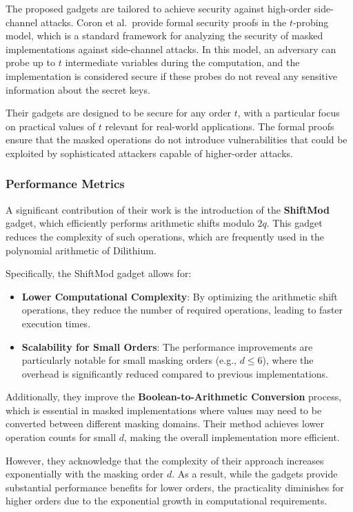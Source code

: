 The proposed gadgets are tailored to achieve security against high-order side-channel attacks. Coron et al.\ provide formal security proofs in the $t$-probing model, which is a standard framework for analyzing the security of masked implementations against side-channel attacks. In this model, an adversary can probe up to $t$ intermediate variables during the computation, and the implementation is considered secure if these probes do not reveal any sensitive information about the secret keys.

Their gadgets are designed to be secure for any order $t$, with a particular focus on practical values of $t$ relevant for real-world applications. The formal proofs ensure that the masked operations do not introduce vulnerabilities that could be exploited by sophisticated attackers capable of higher-order attacks.

\subsubsection{Performance Metrics}

A significant contribution of their work is the introduction of the \textbf{ShiftMod} gadget, which efficiently performs arithmetic shifts modulo $2q$. This gadget reduces the complexity of such operations, which are frequently used in the polynomial arithmetic of Dilithium.

Specifically, the ShiftMod gadget allows for:

\begin{itemize}
    \item \textbf{Lower Computational Complexity}: By optimizing the arithmetic shift operations, they reduce the number of required operations, leading to faster execution times.
    \item \textbf{Scalability for Small Orders}: The performance improvements are particularly notable for small masking orders (e.g., $d \leq 6$), where the overhead is significantly reduced compared to previous implementations.
\end{itemize}

Additionally, they improve the \textbf{Boolean-to-Arithmetic Conversion} process, which is essential in masked implementations where values may need to be converted between different masking domains. Their method achieves lower operation counts for small $d$, making the overall implementation more efficient.

However, they acknowledge that the complexity of their approach increases exponentially with the masking order $d$. As a result, while the gadgets provide substantial performance benefits for lower orders, the practicality diminishes for higher orders due to the exponential growth in computational requirements.

